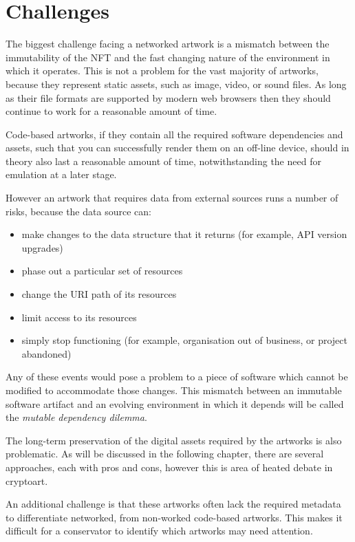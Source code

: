 \section{Challenges}
\label{sec:challenges}

The biggest challenge facing a networked artwork is a mismatch between the immutability of the NFT and the fast changing nature of the environment in which it operates. This is not a problem for the vast majority of artworks, because they represent static assets, such as image, video, or sound files. As long as their file formats are supported by modern web browsers then they should continue to work for a reasonable amount of time.

Code-based artworks, if they contain all the required software dependencies and assets, such that you can successfully render them on an off-line device, should in theory also last a reasonable amount of time, notwithstanding the need for emulation at a later stage.

However an artwork that requires data from external sources runs a number of risks, because the data source can:

\begin{itemize}
    \item make changes to the data structure that it returns (for example, API version upgrades)
    \item phase out a particular set of resources
    \item change the URI path of its resources
    \item limit access to its resources
    \item simply stop functioning (for example, organisation out of business, or project abandoned)
\end{itemize}

Any of these events would pose a problem to a piece of software which cannot be modified to accommodate those changes. This mismatch between an immutable software artifact and an evolving environment in which it depends will be called the \emph{mutable dependency dilemma}.

The long-term preservation of the digital assets required by the artworks is also problematic. As will be discussed in the following chapter, there are several approaches, each with pros and cons, however this is area of heated debate in cryptoart.

An additional challenge is that these artworks often lack the required metadata to differentiate networked, from non-worked code-based artworks. This makes it difficult for a conservator to identify which artworks may need attention.

